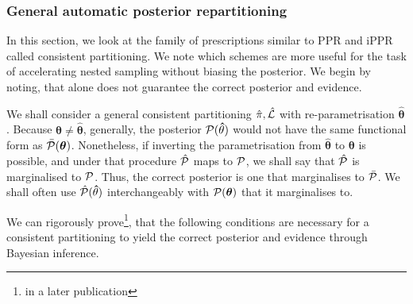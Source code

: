 \documentclass[draft,usenatbib]{mnras}
\begin{document}
\subsubsection{General automatic posterior repartitioning}
\label{sec:orgd059e47}

In this section, we look at the family of prescriptions similar to PPR
and iPPR called consistent partitioning. We note which schemes are
more useful for the task of accelerating nested sampling without
biasing the posterior. We begin by noting, that 
alone does not guarantee the correct posterior and evidence.

We shall consider a general consistent partitioning
\(\hat{\pi}, \hat{\cal L}\) with re-parametrisation
\(\hat{\bm{\theta}}\). Because \(\bm{\theta} \ne \hat{\bm{\theta}}\),
generally, the posterior \({\cal P}(\bm\hat{\theta})\) would not have
the same functional form as \(\bar{\cal
    P}(\bm{\theta})\). Nonetheless, if inverting the parametrisation
from \(\bm{\hat{\theta}}\) to \(\bm{\theta}\) is possible, and under that
procedure \(\hat{\cal P}\) maps to \({\cal P}\), we shall say that
\(\hat{\cal P}\) is marginalised to \({\cal P}\). Thus, the correct
posterior is one that marginalises to \(\bar{\cal P}\). We shall often
use \(\hat{\cal P}(\bm\hat{\theta})\) interchangeably with
\({\cal P}(\bm{\theta})\) that it marginalises to.

We can rigorously prove\footnote{in a later publication}, that the
following conditions are necessary for a consistent partitioning
to yield the correct posterior and evidence through Bayesian
inference.

\end{document}
